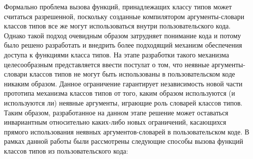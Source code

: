 Формально проблема вызова функций, принадлежащих классу типов может считаться разрешенной, поскольку созданные компилятором аргументы-словари классов типов все же могут использоваться внутри пользовательского кода. Однако такой подход очевидным образом затрудняет понимание кода и потому было решено разработать и внедрить более подходящий механизм обеспечения доступа к функциями класса типов. На этапе разработки такого механизма целесообразным представляется ввести постулат о том, что неявные аргументы-словари классов типов не могут быть использованы в пользовательском коде никаким образом. Данное ограничение гарантирует независимость новой части прототипа механизма классов типов от того, каким образом используются (и используются ли) неявные аргументы, играющие роль словарей классов типов. Таким образом, разработанное на данном этапе решение может оставаться инвариантным относительно каких-либо новых ограничений, касающихся прямого использования неявных аргументов-словарей в пользовательском коде. В рамках данной работы были рассмотрены следующие способы вызова функций классов типов из пользовательского кода:
